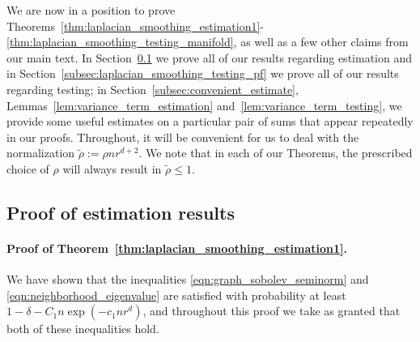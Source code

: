 \documentclass[twoside]{article}
\newcommand{\1}{\mathbf{1}}
\newcommand{\wt}[1]{\widetilde{#1}}
\theoremstyle{definition}
\theoremstyle{remark}
\begin{document}
We are now in a position to prove Theorems~\ref{thm:laplacian_smoothing_estimation1}-\ref{thm:laplacian_smoothing_testing_manifold}, as well as a few other claims from our main text. In Section~\ref{subsec:laplacian_smoothing_estimation1_pf} we prove all of our results regarding estimation and in Section~\ref{subsec:laplacian_smoothing_testing_pf} we prove all of our results regarding testing; in Section~\ref{subsec:convenient_estimate}, Lemmas~\ref{lem:variance_term_estimation} and~\ref{lem:variance_term_testing}, we provide some useful estimates on a particular pair of sums that appear repeatedly in our proofs. Throughout, it will be convenient for us to deal with the normalization $\wt{\rho} := \rho nr^{d + 2}$. We note that in each of our Theorems, the prescribed choice of $\rho$ will always result in $\wt{\rho} \leq 1$. 

\subsection{Proof of estimation results}
\label{subsec:laplacian_smoothing_estimation1_pf}

\paragraph{Proof of Theorem~\ref{thm:laplacian_smoothing_estimation1}.}
We have shown that the inequalities \eqref{eqn:graph_sobolev_seminorm} and \eqref{eqn:neighborhood_eigenvalue} are satisfied with probability at least $1 - \delta - C_1n\exp(-c_1nr^d)$, and throughout this proof we take as granted that both of these inequalities hold.
\end{document}
